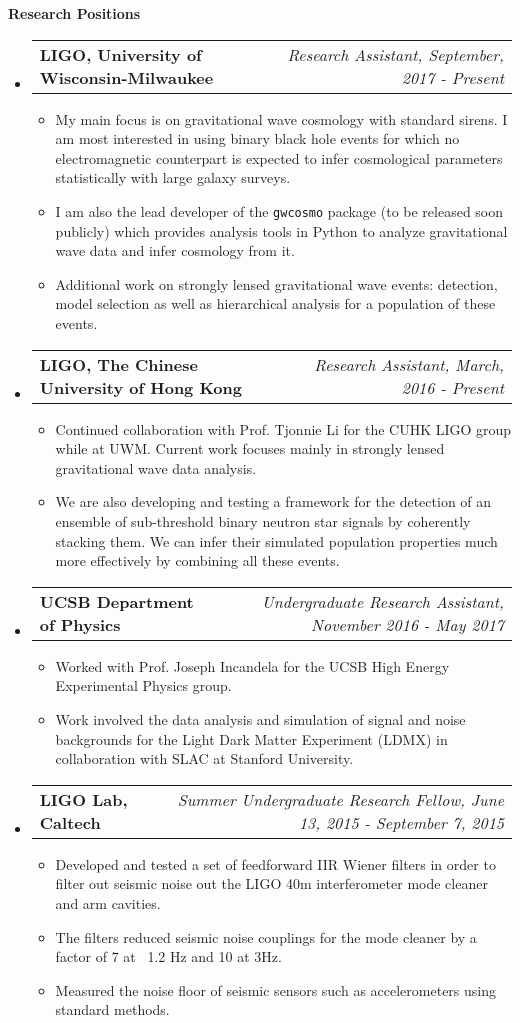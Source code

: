 \documentclass[letterpaper,10pt]{article}
\makeatletter
\newcommand{\resitem}[1]{\item #1 \vspace{-2pt}}
\newcommand{\resheading}[1]{{\large \colorbox{mygrey}{\begin{minipage}{\textwidth}{\textbf{#1 \vphantom{p\^{E}}}}\end{minipage}}}}
\newcommand{\ressubheading}[4]{
\begin{tabular*}{7.0in}{l@{\extracolsep{\fill}}r}
		\textbf{#1} & \textit{#4} \\
\end{tabular*}\vspace{-6pt}}
\makeatother
\begin{document}
\resheading{Research Positions}
\begin{itemize}
\item
	\ressubheading{LIGO, University of Wisconsin-Milwaukee}{Milwaukee}{Research Assistant}{Research Assistant, September, 2017 - Present}
	\begin{itemize}
		\resitem{My main focus is on gravitational wave cosmology with standard sirens. I am most interested in using binary black hole events for which no electromagnetic counterpart is expected to infer cosmological parameters statistically with large galaxy surveys.}
		\resitem{I am also the lead developer of the \texttt{gwcosmo} package (to be released soon publicly) which provides analysis tools in Python to analyze gravitational wave data and infer cosmology from it. }
		\resitem{Additional work on strongly lensed gravitational wave events: detection, model selection as well as hierarchical analysis for a population of these events.}
	\end{itemize}
\item
	\ressubheading{LIGO, The Chinese University of Hong Kong}{Hong Kong}{Research Assistant}{Research Assistant, March, 2016 - Present}
	\begin{itemize}
		\resitem{Continued collaboration with Prof. Tjonnie Li for the CUHK LIGO group while at UWM. Current work focuses mainly in strongly lensed gravitational wave data analysis.}
		\resitem{We are  also developing and testing a framework for the detection of an ensemble of sub-threshold binary neutron star signals by coherently stacking them. We can infer their simulated population properties much more effectively by combining all these events.}
	\end{itemize}
\item
	\ressubheading{UCSB Department of Physics}{Santa Barbara, CA}{Undergraduate Research Assistant}{Undergraduate Research Assistant, November 2016 - May 2017}
	\begin{itemize}
		\resitem{Worked with Prof. Joseph Incandela for the UCSB High Energy Experimental Physics group.}
		\resitem{Work involved the data analysis and simulation of signal and noise backgrounds for the Light Dark Matter Experiment (LDMX) in collaboration with SLAC at Stanford University.}
	\end{itemize}
\item
	\ressubheading{LIGO Lab, Caltech}{Pasadena, CA}{Summer Undergraduate Research Fellow}{Summer Undergraduate Research Fellow, June 13, 2015 - September 7, 2015}
	\begin{itemize}
		\resitem{Developed and tested a set of feedforward IIR Wiener filters in order to filter out seismic noise out the LIGO 40m interferometer mode cleaner and arm cavities.} 
		\resitem{The filters reduced seismic noise couplings for the mode cleaner by a factor of 7 at ~1.2 Hz and 10 at 3Hz. }
		\resitem{Measured the noise floor of seismic sensors such as accelerometers using standard methods.}
	\end{itemize}
\end{itemize}
\end{document}
